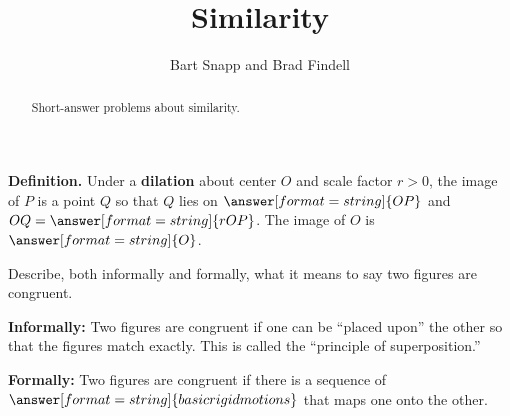 \documentclass[nooutcomes]{ximera}
\title{Similarity}
\author{Bart Snapp and Brad Findell}
\begin{document}
\begin{abstract}
Short-answer problems about similarity. 
\end{abstract}
\maketitle




%
%
%
%

\begin{question}
\textbf{Definition.} Under a \textbf{dilation} about center $O$ and scale factor $r>0$, the image of $P$ is 
a point $Q$ so that $Q$ lies on  
$\answer[format=string]{OP}$ %
and $OQ=\answer[format=string]{rOP}$.  The image of $O$ is $\answer[format=string]{O}$. 
\end{question}


\begin{question}
Describe, both informally and formally, what it means to say two figures are congruent.
\begin{freeResponse}
\end{freeResponse}
\begin{feedback}
\textbf{Informally:}  Two figures are congruent if one can be ``placed upon'' the other so that the figures match exactly.  This is called the ``principle of superposition.''  

\textbf{Formally:}  Two figures are congruent if there is a sequence of $\answer[format=string]{basic rigid motions}$ that maps one onto the other.  
\end{feedback}
\end{question}
\end{document}
